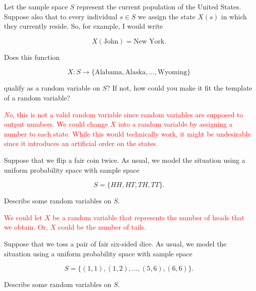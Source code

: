 \documentclass[12pt,reqno]{amsart}
\begin{document}
\bigskip

\prob Let the sample space $S$ represent the current population of the United States. Suppose also that to every individual $s\in S$ we assign the state $X(s)$ in which they currently reside. So, for example, I would write

	\[
	X(\text{John}) = \text{New York}.
	\]

Does this function

	\[
	X: S \to \{\text{Alabama}, \text{Alaska},\ldots,\text{Wyoming}\}
	\]

qualify as a random variable on $S$? If not, how could you make it fit the template of a random variable?

\bigskip
\textcolor{red}{\textit{No}, this is not a valid random variable since random variables are supposed to output numbers. We could change $X$ into a random variable by assigning a number to each state. While this would technically work, it might be undesirable since it introduces an artificial order on the states.}
\bigskip
















\bigskip
\prob Suppose that we flip a fair coin twice. As usual, we model the situation using a uniform probability space with sample space

	\[
	S = \{ HH, HT, TH, TT\}.
	\]

Describe some random variables on $S$.

\bigskip
\textcolor{red}{We could let $X$ be a random variable that represents the number of heads that we obtain. Or, $X$ could be the number of tails.}
\bigskip

















\bigskip

\prob Suppose that we toss a pair of fair six-sided dice. As usual, we model the situation using a uniform probability space with sample space

	\[
	S = \{(1,1),(1,2),\ldots,(5,6),(6,6)\}.
	\]

Describe some random variables on $S$.
\end{document}
